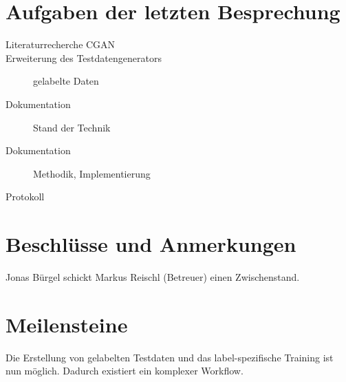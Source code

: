 
\newcommand{\Titel}{6. Protokoll}
\newcommand{\Teilnehmer}{Jonas Bürgel, Patrick Welter}
\newcommand{\DatumUndZeit}{21.02.2022 20:00-20:15}
\newcommand{\Ort}{Discord Meeting}
\newcommand{\Thema}{Erweiterung GAN: Einführung gelabelte Daten}


\section{Aufgaben der letzten Besprechung}
\begin{description}
	\item[Literaturrecherche CGAN]  \halfcheck
	\item[Erweiterung des Testdatengenerators] gelabelte Daten  \fullcheck
	\item[Dokumentation] Stand der Technik  \fullcheck
	\item[Dokumentation] Methodik, Implementierung  \halfcheck
	\item[Protokoll]  \fullcheck
\end{description}


\section{Beschlüsse und Anmerkungen}
\begin{description}[style=nextline]
	\item[Zwischenstand]
	Jonas Bürgel schickt Markus Reischl (Betreuer) einen Zwischenstand.
\end{description}

\section{Meilensteine}
\begin{description}[style=nextline]
	\item[Komplexer Trainingsworkflow mit gelabelten Daten \hfill \fullcheck]
	Die Erstellung von gelabelten Testdaten und das label-spezifische Training ist nun möglich.
	Dadurch existiert ein komplexer Workflow.
\end{description}

